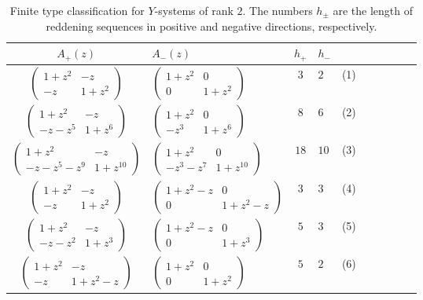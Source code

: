 \documentclass[pdftex]{sigma}
\numberwithin{equation}{section}
\theoremstyle{definition}
\begin{document}
\begin{table}[t]
 \centering
 \begin{tabular}{ Sl|Sl|Sl|Sl| Sl }
 \hline
 $A_+(z)$ &
 $A_-(z)$ &
 $h_+$ &
 $h_-$ & \\
 \hline
 $\begin{pmatrix}
 1 + z^2 & -z \\
 -z & 1 + z^2
 \end{pmatrix}$ &
 $\begin{pmatrix}
 1 + z^2 & 0 \\
 0 & 1 + z^2
 \end{pmatrix}$ &
 $3$ & $2$ &
 (1) \\
 $\begin{pmatrix}
 1 + z^2 & -z \\
 - z - z^5 & 1 + z^6
 \end{pmatrix}$ &
 $\begin{pmatrix}
 1 + z^2 & 0 \\
 -z^3 & 1 + z^6
 \end{pmatrix}$ &
 $8$ & $6$ &
 (2) \\
 $\begin{pmatrix}
 1 + z^2 & - z \\
 - z - z^5 - z^9 & 1 + z^{10}
 \end{pmatrix}$ &
 $\begin{pmatrix}
 1 + z^2 & 0 \\
 -z^3 - z^7 & 1 + z^{10}
 \end{pmatrix}$ &
 $18$ & $10$ &
 (3) \\
 $\begin{pmatrix}
 1 + z^2 & - z \\
 - z & 1 + z^2
 \end{pmatrix}$ &
 $\begin{pmatrix}
 1 + z^2 - z & 0 \\
 0 & 1 + z^2 - z
 \end{pmatrix}$ &
 $3$ & $3$ &
 (4) \\
 $\begin{pmatrix}
 1 + z^2 & -z \\
 -z -z^2 & 1 + z^3
 \end{pmatrix}$ &
 $\begin{pmatrix}
 1 + z^2 - z & 0 \\
 0 & 1 + z^3
 \end{pmatrix}$ &
 $5$ & $3$ &
 (5) \\
 $\begin{pmatrix}
 1 + z^2 & - z \\
 - z & 1 + z^2 - z
 \end{pmatrix}$ &
 $\begin{pmatrix}
 1 + z^2 & 0 \\
 0 & 1 + z^2
 \end{pmatrix}$ &
 $5$ & $2$ &
 (6) \\
 \hline
 \end{tabular}
\caption{Finite type classification for $Y$-systems of rank $2$. The numbers $h_{\pm}$ are the length of
reddening sequences in positive and negative directions, respectively.}
\label{table:finie type}
\end{table}
\end{document}
